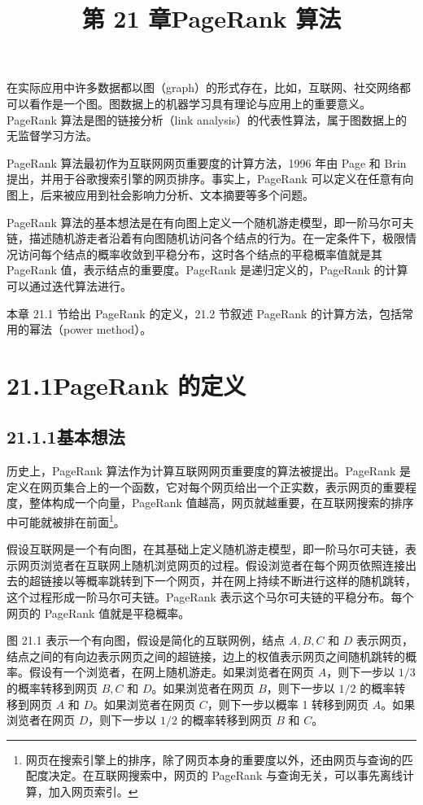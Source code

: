 \documentclass[UTF8,12pt,a4paper,fontset=fandol]{ctexart}
\title{第 21 章\quad PageRank 算法}
\author{}
\date{}
\begin{document}
\maketitle

在实际应用中许多数据都以图（graph）的形式存在，比如，互联网、社交网络都可以看作是一个图。图数据上的机器学习具有理论与应用上的重要意义。PageRank 算法是图的链接分析（link analysis）的代表性算法，属于图数据上的无监督学习方法。

PageRank 算法最初作为互联网网页重要度的计算方法，1996 年由 Page 和 Brin 提出，并用于谷歌搜索引擎的网页排序。事实上，PageRank 可以定义在任意有向图上，后来被应用到社会影响力分析、文本摘要等多个问题。

PageRank 算法的基本想法是在有向图上定义一个随机游走模型，即一阶马尔可夫链，描述随机游走者沿着有向图随机访问各个结点的行为。在一定条件下，极限情况访问每个结点的概率收敛到平稳分布，这时各个结点的平稳概率值就是其 PageRank 值，表示结点的重要度。PageRank 是递归定义的，PageRank 的计算可以通过迭代算法进行。

本章 21.1 节给出 PageRank 的定义，21.2 节叙述 PageRank 的计算方法，包括常用的幂法（power method）。

\section*{21.1\quad PageRank 的定义}

\subsection*{21.1.1\quad 基本想法}

历史上，PageRank 算法作为计算互联网网页重要度的算法被提出。PageRank 是定义在网页集合上的一个函数，它对每个网页给出一个正实数，表示网页的重要程度，整体构成一个向量，PageRank 值越高，网页就越重要，在互联网搜索的排序中可能就被排在前面\footnote{网页在搜索引擎上的排序，除了网页本身的重要度以外，还由网页与查询的匹配度决定。在互联网搜索中，网页的 PageRank 与查询无关，可以事先离线计算，加入网页索引。}。

假设互联网是一个有向图，在其基础上定义随机游走模型，即一阶马尔可夫链，表示网页浏览者在互联网上随机浏览网页的过程。假设浏览者在每个网页依照连接出去的超链接以等概率跳转到下一个网页，并在网上持续不断进行这样的随机跳转，这个过程形成一阶马尔可夫链。PageRank 表示这个马尔可夫链的平稳分布。每个网页的 PageRank 值就是平稳概率。

图 21.1 表示一个有向图，假设是简化的互联网例，结点 $A,B,C$ 和 $D$ 表示网页，结点之间的有向边表示网页之间的超链接，边上的权值表示网页之间随机跳转的概率。假设有一个浏览者，在网上随机游走。如果浏览者在网页 $A$，则下一步以 $1/3$ 的概率转移到网页 $B,C$ 和 $D$。如果浏览者在网页 $B$，则下一步以 $1/2$ 的概率转移到网页 $A$ 和 $D$。如果浏览者在网页 $C$，则下一步以概率 1 转移到网页 $A$。如果浏览者在网页 $D$，则下一步以 $1/2$ 的概率转移到网页 $B$ 和 $C$。
\end{document}
